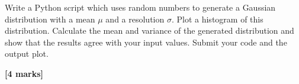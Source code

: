 \begin{enumerate}
Write a Python script which uses random numbers to generate a Gaussian distribution with a mean $\mu$ and a resolution $\sigma$.
Plot a histogram of this distribution.
Calculate the mean and variance of the generated distribution and show that the results agree with your input values.
Submit your code and the output plot.

\hfill {\bf [4 marks]}



\begin{comment}
\item Write a short Python script which generates a flat distribution and plots a histogram of the distribution.
Calculate the mean and variance of the generated distribution and show that for a flat distribution between $a$ and $b$, the relation $\sigma = \frac{b-a}{\sqrt{12}}$ for the resolution $\sigma$ is satisfied.
You need to submit your code.

Derive the relation $\sigma = \frac{b-a}{\sqrt{12}}$ for the resolution $\sigma$ of a flat distribution between $a$ and $b$.

\hfill {\bf [6 marks]}
\end{comment}

\end{enumerate}
